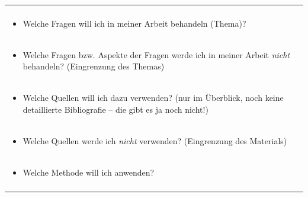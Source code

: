 \documentclass[]{book}
\providecommand{\tightlist}{%
  \setlength{\itemsep}{0pt}\setlength{\parskip}{0pt}}
\theoremstyle{definition}
\theoremstyle{definition}
\theoremstyle{definition}
\theoremstyle{remark}
\begin{document}
\begin{longtable}[]{@{}l@{}}
\begin{minipage}[t]{0.97\columnwidth}
\begin{itemize}
\end{itemize}\strut
\end{minipage}\tabularnewline
\begin{minipage}[t]{0.97\columnwidth}\raggedright\strut
\begin{itemize}
\tightlist
\item
  Welche Fragen will ich in meiner Arbeit behandeln (Thema)?
  \vspace{-6mm}
\end{itemize}\strut
\end{minipage}\tabularnewline
\begin{minipage}[t]{0.97\columnwidth}\raggedright\strut
\begin{itemize}
\tightlist
\item
  Welche Fragen bzw. Aspekte der Fragen werde ich in meiner Arbeit
  \emph{nicht} behandeln? (Eingrenzung des Themas) \vspace{-6mm}
\end{itemize}\strut
\end{minipage}\tabularnewline
\begin{minipage}[t]{0.97\columnwidth}\raggedright\strut
\begin{itemize}
\tightlist
\item
  Welche Quellen will ich dazu verwenden? (nur im Überblick, noch keine
  detaillierte Bibliografie -- die gibt es ja noch nicht!) \vspace{-6mm}
\end{itemize}\strut
\end{minipage}\tabularnewline
\begin{minipage}[t]{0.97\columnwidth}\raggedright\strut
\begin{itemize}
\tightlist
\item
  Welche Quellen werde ich \emph{nicht} verwenden? (Eingrenzung des
  Materials) \vspace{-6mm}
\end{itemize}\strut
\end{minipage}\tabularnewline
\begin{minipage}[t]{0.97\columnwidth}\raggedright\strut
\begin{itemize}
\tightlist
\item
  Welche Methode will ich anwenden? \vspace{-6mm}
\end{itemize}\strut
\end{minipage}\tabularnewline
\begin{minipage}[t]{0.97\columnwidth}\raggedright\strut

\end{minipage}
\end{longtable}
\end{document}
